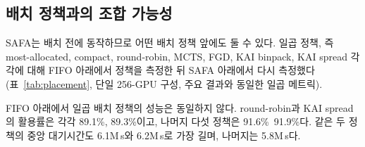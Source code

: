 \documentclass{ieeetj}
\begin{document}
\begin{table}[htb!]
\centering
\caption{독립 대규모 트레이스에서의 일반화}
\label{tab:trace3}
\scriptsize
\setlength{\tabcolsep}{4pt}
\end{table}

\subsection{배치 정책과의 조합 가능성}\label{eval:robust:placement}
SAFA는 배치 전에 동작하므로 어떤 배치 정책 앞에도 둘 수 있다. 일곱 정책, 즉 most-allocated, compact, round-robin, MCTS, FGD, KAI binpack, KAI spread 각각에 대해 FIFO 아래에서 정책을 측정한 뒤 SAFA 아래에서 다시 측정했다(표~\ref{tab:placement}, 단일 256-GPU 구성, 주요 결과와 동일한 일곱 메트릭).

FIFO 아래에서 일곱 배치 정책의 성능은 동일하지 않다. round-robin과 KAI spread의 활용률은 각각 89.1\%, 89.3\%이고, 나머지 다섯 정책은 91.6\%~91.9\%다. 같은 두 정책의 중앙 대기시간도 6.1M\,s와 6.2M\,s로 가장 길며, 나머지는 5.8M\,s다.
\end{document}
